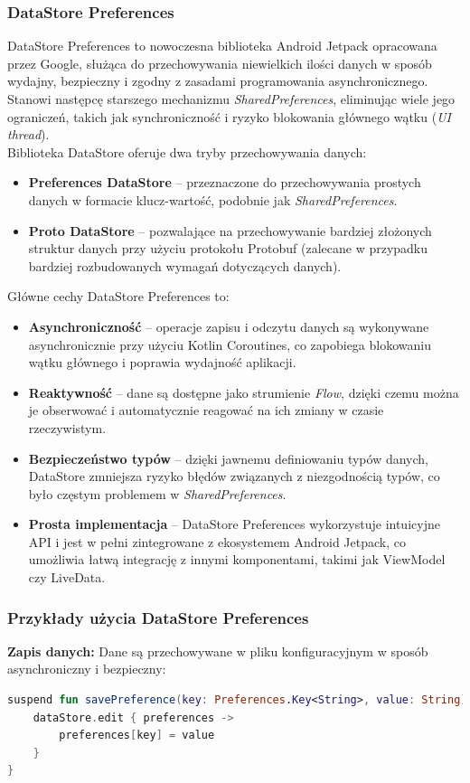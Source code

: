 \documentclass[12pt]{article}
\begin{document}
\subsubsection{DataStore Preferences}
DataStore Preferences to nowoczesna biblioteka Android Jetpack opracowana przez Google, służąca do przechowywania niewielkich ilości danych w sposób wydajny,
bezpieczny i zgodny z zasadami programowania asynchronicznego. Stanowi następcę starszego mechanizmu \textit{SharedPreferences}, eliminując wiele jego ograniczeń,
takich jak synchroniczność i ryzyko blokowania głównego wątku (\textit{UI thread}).\\
Biblioteka DataStore oferuje dwa tryby przechowywania danych:
\begin{itemize}
    \item \textbf{Preferences DataStore} – przeznaczone do przechowywania prostych danych w formacie klucz-wartość, podobnie jak \textit{SharedPreferences}.
    \item \textbf{Proto DataStore} – pozwalające na przechowywanie bardziej złożonych struktur danych przy użyciu protokołu Protobuf
	(zalecane w przypadku bardziej rozbudowanych wymagań dotyczących danych).
\end{itemize}
Główne cechy DataStore Preferences to:
\begin{itemize}
    \item \textbf{Asynchroniczność} – operacje zapisu i odczytu danych są wykonywane asynchronicznie przy użyciu Kotlin Coroutines,
	co zapobiega blokowaniu wątku głównego i poprawia wydajność aplikacji.
    \item \textbf{Reaktywność} – dane są dostępne jako strumienie \textit{Flow}, dzięki czemu można je obserwować i automatycznie reagować na ich zmiany
	w czasie rzeczywistym.
    \item \textbf{Bezpieczeństwo typów} – dzięki jawnemu definiowaniu typów danych, DataStore zmniejsza ryzyko błędów związanych z niezgodnością typów,
	co było częstym problemem w \textit{SharedPreferences}.
    \item \textbf{Prosta implementacja} – DataStore Preferences wykorzystuje intuicyjne API i jest w pełni zintegrowane z ekosystemem Android Jetpack, co umożliwia łatwą integrację z innymi komponentami, takimi jak ViewModel czy LiveData.
\end{itemize}

\subsubsection*{Przykłady użycia DataStore Preferences}
\noindent \textbf{Zapis danych:} Dane są przechowywane w pliku konfiguracyjnym w sposób asynchroniczny i bezpieczny:
\begin{lstlisting}[language=Kotlin]
suspend fun savePreference(key: Preferences.Key<String>, value: String) {
    dataStore.edit { preferences ->
        preferences[key] = value
    }
}
\end{lstlisting}
\end{document}
